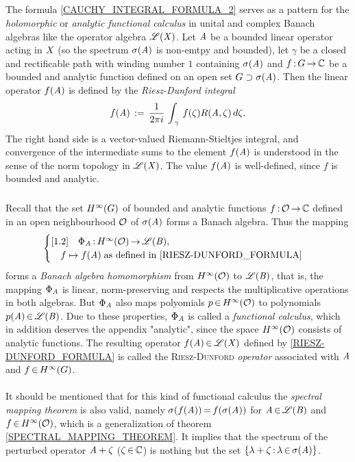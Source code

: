 \documentclass[11pt,twoside]{article}
\begin{document}
\subparagraph{} %
The formula \eqref{CAUCHY_INTEGRAL_FORMULA_2} serves as a pattern
for the \textit{holomorphic} or \textit{analytic functional calculus}
in unital and complex Banach algebras like the operator algebra $\mathscr{L}(\mathit{X})$.
Let $\mathit{A}$ be a bounded linear operator acting in $\mathit{X}$
(so the spectrum $\sigma(\mathit{A})$ is non-emtpy and bounded),
let $\gamma$ be a closed and rectificable path with winding number $1$
containing $\sigma(\mathit{A})$
and $f {\,:\,} G {\,\to\,} {\mathbb{C}}$ be a bounded and analytic function
defined on an open set $G \supset \sigma(\mathit{A})$.
Then the linear operator $f(\mathit{A})$ is defined
by the \textit{Riesz-Dunford integral}
\begin{equation}\label{RIESZ-DUNFORD_FORMULA}
f(\mathit{A}) \,:=\,
\frac{1}{2 \pi i} \, \int_{\,\gamma} \, f(\zeta) R(\mathit{A},\zeta) \, d\zeta.
\end{equation}
The right hand side is a vector-valued Riemann-Stieltjes integral,
and convergence of the intermediate sums to the element
$f(\mathit{A})$ is understood in the sense of the norm topology in $\mathscr{L}(\mathit{X})$.
The value $f(\mathit{A})$ is well-defined,
since $f$ is bounded and analytic.

\subparagraph{}
Recall
that the set $H^{\infty}(G)$ of bounded and analytic functions
$f {\,:\,} \mathcal{O} {\,\to\,} {\mathbb{C}}$ defined in an open neighbourhood $\mathcal{O}$
of $\sigma(\mathit{A})$ forms a Banach algebra.
Thus the mapping
\[
\begin{cases}[1.2]
\quad \Phi_{\mathit{A}} {\,:\,} H^{\infty}(\mathcal{O}) {\,\to\,} \mathscr{L}(\mathit{B}),\\
\quad
f \mapsto f(\mathit{A}) \; \mbox{as defined in \eqref{RIESZ-DUNFORD_FORMULA}} \\
\end{cases}
\]
forms a \textit{Banach algebra homomorphism}
from $H^{\infty}(\mathcal{O})$ to $\mathscr{L}(\mathit{B})$,
that is,
the mapping $\Phi_{\mathit{A}}$ is linear, norm-preserving
and respects the multiplicative operations in both algebras.
But $\Phi_{\mathit{A}}$ also maps polyomials $p {\,\in\,} H^{\infty}(\mathcal{O})$
to polynomials $p(\mathit{A}) {\,\in\,} \mathscr{L}(\mathit{B})$.
Due to these properties,
$\Phi_{\mathit{A}}$ is called a \textit{functional calculus},
which in addition deserves the appendix "analytic",
since the space $H^{\infty}(\mathcal{O})$ consists of analytic functions.
The resulting operator $f(\mathit{A}) {\,\in\,} \mathscr{L}(\mathit{X})$
defined by \eqref{RIESZ-DUNFORD_FORMULA}
is called the \textsc{Riesz-Dunford} \textit{operator}
associated with $\mathit{A}$ and $f {\,\in\,} H^{\infty}(G)$.

\paragraph{} %
It should be mentioned 
that for this kind of functional calculus the
\textit{spectral mapping theorem} is also valid,
namely
$\sigma(f(\mathit{A})) {\,=\,} f(\sigma(\mathit{A}))$
for $\mathit{A} {\,\in\,} \mathscr{L}(\mathit{B})$ and $f {\,\in\,} H^{\infty}(\mathcal{O})$,
which is a generalization of theorem \ref{SPECTRAL_MAPPING_THEOREM}.
It implies that the spectrum of the perturbed operator
$\mathit{A}+\zeta$ ($\zeta {\,\in\,} {\mathbb{C}}$) is nothing but the set
$\{\lambda+\zeta {\,:\,} \lambda {\,\in\,} \sigma(\mathit{A})\}$.
\end{document}
